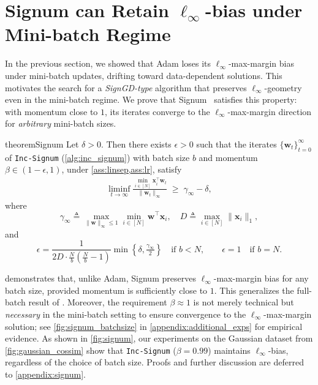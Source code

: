 \documentclass{article} %
\theoremstyle{plain}
\theoremstyle{definition}
\theoremstyle{remark}
\def\bx{{\mathbf x}}
\def\bw{{\mathbf w}}
\begin{document}
\section{Signum can Retain $\ell_\infty$-bias under Mini-batch Regime}\label{sec:signum}

In the previous section, we showed that Adam loses its $\ell_\infty$-max-margin bias under mini-batch updates, drifting toward data-dependent solutions. This motivates the search for a \emph{SignGD-type} algorithm that preserves $\ell_\infty$-geometry even in the mini-batch regime. We prove that Signum~\citep{bernstein2018sign} satisfies this property: with momentum close to $1$, its iterates converge to the $\ell_\infty$-max-margin direction for \emph{arbitrary} mini-batch sizes.

\begin{restatable}{theorem}{Signum}\label{thm:signum}
Let $\delta > 0$. Then there exists $\epsilon > 0$ such that the iterates $\{\bw_t\}_{t=0}^\infty$ of \textnormal{\texttt{Inc-Signum}} (\cref{alg:inc_signum}) with batch size $b$ and momentum $\beta \in (1-\epsilon,1)$, under \cref{ass:linsep,ass:lr}, satisfy
\begin{align}
\liminf_{t \to \infty} \frac{\min_{i \in [N]} \bx_i^\top \bw_t}{\|\bw_t\|_\infty} \;\geq\; \gamma_\infty - \delta,
\end{align}
where
\[
\gamma_\infty \triangleq \max_{\|\bw\|_\infty \leq 1} \min_{i \in [N]} \bw^\top \bx_i, 
\quad 
D \triangleq \max_{i \in [N]} \|\bx_i\|_1,
\]
and
\[
\epsilon = \frac{1}{2D \cdot \tfrac Nb (\tfrac Nb -1)} \min\!\left\{\delta, \tfrac{\gamma_\infty}{2}\right\}
\quad \text{if } b < N, 
\qquad 
\epsilon = 1 \quad \text{if } b = N.
\]
\end{restatable}

 demonstrates that, unlike Adam, Signum preserves $\ell_\infty$-max-margin bias for any batch size, provided momentum is sufficiently close to $1$. This generalizes the full-batch result of \citet{fan2025implicitbiasspectraldescent}. Moreover, the requirement $\beta \approx 1$ is not merely technical but \emph{necessary} in the mini-batch setting to ensure convergence to the $\ell_\infty$-max-margin solution; see \cref{fig:signum_batchsize} in \cref{appendix:additional_exps} for empirical evidence. As shown in \cref{fig:signum}, our experiments on the Gaussian dataset from \cref{fig:gaussian_cossim} show that \texttt{Inc-Signum} ($\beta=0.99$) maintains $\ell_\infty$-bias, regardless of the choice of batch size. Proofs and further discussion are deferred to \cref{appendix:signum}. 
\end{document}

